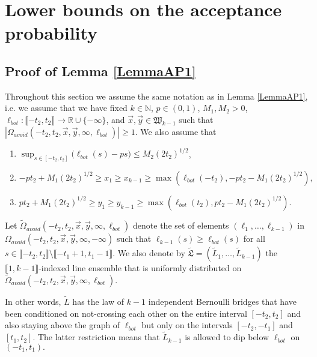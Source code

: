 %
\section{Lower bounds on the acceptance probability}\label{Section6}

\subsection{Proof of Lemma \ref{LemmaAP1}}\label{sect61} Throughout this section we assume the same notation as in Lemma \ref{LemmaAP1}, i.e. we assume that we have fixed $k \in \mathbb{N}$, $p \in (0,1)$, $M_1, M_2 > 0$, $\ell_{bot}: \llbracket -t_2, t_2 \rrbracket \rightarrow \mathbb{R} \cup \{ - \infty \}$, and $\vec{x}, \vec{y} \in \mathfrak{W}_{k-1}$ such that $|\Omega_{avoid}(-t_2, t_2, \vec{x}, \vec{y}, \infty, \ell_{bot})| \geq 1$. We also assume that
\begin{enumerate}
	\item $\sup_{s \in [- t_2,t_2]}\big(\ell_{bot}(s)  - ps \big)  \leq M_2 (2t_2)^{1/2}$,
	\item  $-pt_2 + M_1 (2t_2)^{1/2} \geq  x_1 \geq  x_{k-1} \geq \max\left(\ell_{bot}(-t_2), -pt_2- M_1 (2t_2)^{1/2}\right),$
	\item $pt_2 + M_1 (2t_2)^{1/2} \geq y_1 \geq y_{k-1} \geq  \max \left( \ell_{bot}(t_2),  p t_2- M_1(2t_2)^{1/2} \right).$
\end{enumerate}

\begin{definition}
	Let $\tilde{\Omega}_{avoid}(-t_2, t_2, \vec{x}, \vec{y}, \infty, \ell_{bot})$ denote the set of elements $(\ell_1, \dots, \ell_{k-1})$ in \\${\Omega}_{avoid}(-t_2, t_2, \vec{x}, \vec{y}, \infty, -\infty)$ such that $\ell_{k-1}(s) \geq \ell_{bot}(s)$ for all $s \in \llbracket -t_2, t_2 \rrbracket \setminus \llbracket -t_1 + 1, t_1 - 1 \rrbracket$. We also denote by $\tilde{\mathfrak{L}} = (\tilde{L}_1, \dots, \tilde{L}_{k-1})$ the $\llbracket 1, k-1 \rrbracket$-indexed line ensemble that is uniformly distributed on $\tilde{\Omega}_{avoid}(-t_2, t_2, \vec{x}, \vec{y}, \infty, \ell_{bot})$.
\end{definition}
In other words, $\tilde{L}$ has the law of $k-1$ independent Bernoulli bridges that have been conditioned on not-crossing each other on the entire interval $[-t_2, t_2]$ and also staying above the graph of $\ell_{bot}$ but only on the intervals $[-t_2, -t_1]$ and $[t_1, t_2]$. The latter restriction means that $\tilde{L}_{k-1}$ is allowed to dip below $\ell_{bot}$ on $(-t_1, t_1).$ 

